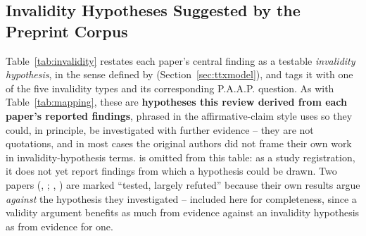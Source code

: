 \documentclass[11pt]{article}
\begin{document}
\subsection{Invalidity Hypotheses Suggested by the Preprint Corpus}
\label{sec:invalidity}

Table~\ref{tab:invalidity} restates each paper's central finding as a testable \emph{invalidity hypothesis}, in the sense defined by \citet{araneda2023dissertation} (Section~\ref{sec:ttxmodel}), and tags it with one of the five invalidity types and its corresponding P.A.A.P. question. As with Table~\ref{tab:mapping}, these are \textbf{hypotheses this review derived from each paper's reported findings}, phrased in the affirmative-claim style \citeauthor{araneda2023dissertation} uses so they could, in principle, be investigated with further evidence -- they are not quotations, and in most cases the original authors did not frame their own work in invalidity-hypothesis terms. \citet{kaleta2025studentperspectives} is omitted from this table: as a study registration, it does not yet report findings from which a hypothesis could be drawn. Two papers (\citeauthor{dang2024vstep}, \citeyear{dang2024vstep}; \citeauthor{nakatsuhara2021videoconferencing}, \citeyear{nakatsuhara2021videoconferencing}) are marked ``tested, largely refuted'' because their own results argue \emph{against} the hypothesis they investigated -- included here for completeness, since a validity argument benefits as much from evidence against an invalidity hypothesis as from evidence for one.
\end{document}
